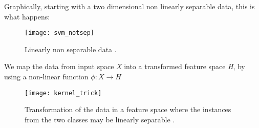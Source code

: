 Graphically, starting with a two dimensional non linearly separable data, this is what happens:
\begin{figure}[H]
	\centering
	\texttt{[image: svm\_notsep]}
	\caption{Linearly non separable data \cite{kernel_trick}.}
\end{figure} 

We map the data from input space \textit{X} into a transformed feature space \textit{H}, by using a non-linear function $\phi: X \rightarrow H$

\begin{figure}[H]
	\centering
	\texttt{[image: kernel\_trick]}
	\caption{Transformation of the data in a feature space where the instances from the two classes may be linearly separable \cite{kernel_trick}.}
\end{figure} 

\clearpage

